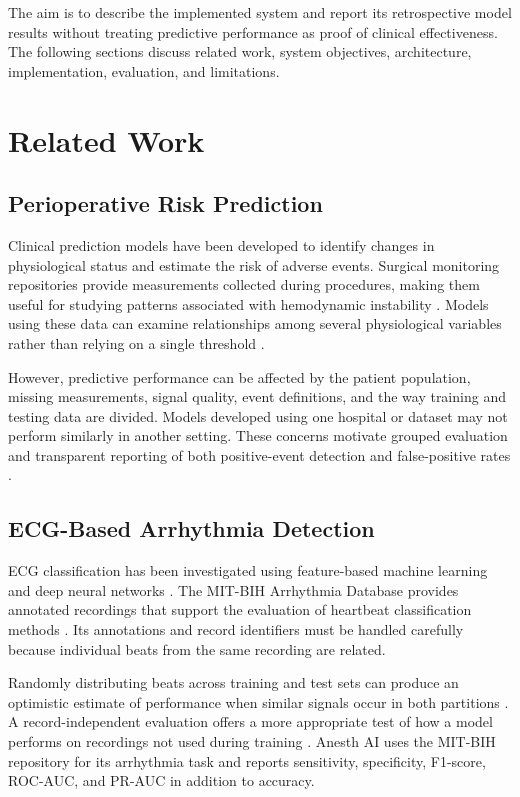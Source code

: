 \documentclass[conference]{IEEEtran}
\begin{document}
The aim is to describe the implemented system and report its retrospective model results without treating predictive performance as proof of clinical effectiveness. The following sections discuss related work, system objectives, architecture, implementation, evaluation, and limitations.

\section{Related Work}

\subsection{Perioperative Risk Prediction}
Clinical prediction models have been developed to identify changes in physiological status and estimate the risk of adverse events. Surgical monitoring repositories provide measurements collected during procedures, making them useful for studying patterns associated with hemodynamic instability \cite{ref1,ref2}. Models using these data can examine relationships among several physiological variables rather than relying on a single threshold \cite{ref5,ref22}.

However, predictive performance can be affected by the patient population, missing measurements, signal quality, event definitions, and the way training and testing data are divided. Models developed using one hospital or dataset may not perform similarly in another setting. These concerns motivate grouped evaluation and transparent reporting of both positive-event detection and false-positive rates \cite{ref10,ref18}.

\subsection{ECG-Based Arrhythmia Detection}
ECG classification has been investigated using feature-based machine learning and deep neural networks \cite{ref6,ref7}. The MIT-BIH Arrhythmia Database provides annotated recordings that support the evaluation of heartbeat classification methods \cite{ref13,ref16}. Its annotations and record identifiers must be handled carefully because individual beats from the same recording are related.

Randomly distributing beats across training and test sets can produce an optimistic estimate of performance when similar signals occur in both partitions \cite{ref17,ref20}. A record-independent evaluation offers a more appropriate test of how a model performs on recordings not used during training \cite{ref25}. Anesth AI uses the MIT-BIH repository for its arrhythmia task and reports sensitivity, specificity, F1-score, ROC-AUC, and PR-AUC in addition to accuracy.
\end{document}
